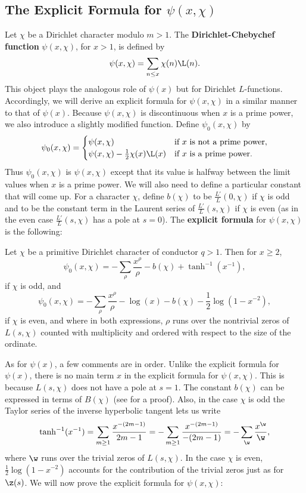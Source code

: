     \subsection*{The Explicit Formula for \texorpdfstring{$\psi(x,\chi)$}{$\psi(x,\chi)$}}
      Let $\chi$ be a Dirichlet character modulo $m > 1$. The \textbf{Dirichlet-Chebychef function} $\psi(x,\chi)$, for $x > 1$, is defined by
      \[
        \psi(x,\chi) = \sum_{n \le x}\chi(n)\L(n).
      \]
      This object plays the analogous role of $\psi(x)$ but for Dirichlet $L$-functions. Accordingly, we will derive an explicit formula for $\psi(x,\chi)$ in a similar manner to that of $\psi(x)$. Because $\psi(x,\chi)$ is discontinuous when $x$ is a prime power, we also introduce a slightly modified function. Define $\psi_{0}(x,\chi)$ by
      \[
        \psi_{0}(x,\chi) = \begin{cases} \psi(x,\chi) & \text{if $x$ is not a prime power}, \\ \psi(x,\chi)-\frac{1}{2}\chi(x)\L(x) & \text{if $x$ is a prime power}. \end{cases}
      \]
      Thus $\psi_{0}(x,\chi)$ is $\psi(x,\chi)$ except that its value is halfway between the limit values when $x$ is a prime power. We will also need to define a particular constant that will come up. For a character $\chi$, define $b(\chi)$ to be $\frac{L'}{L}(0,\chi)$ if $\chi$ is odd and to be the constant term in the Laurent series of $\frac{L'}{L}(s,\chi)$ if $\chi$ is even (as in the even case $\frac{L'}{L}(s,\chi)$ has a pole at $s = 0$). The \textbf{explicit formula} for $\psi(x,\chi)$ is the following:

      \begin{theorem}
        Let $\chi$ be a primitive Dirichlet character of conductor $q > 1$. Then for $x \ge 2$,
        \[
          \psi_{0}(x,\chi) = -\sum_{\rho}\frac{x^{\rho}}{\rho}-b(\chi)+\tanh^{-1}(x^{-1}),
        \]
        if $\chi$ is odd, and
        \[
          \psi_{0}(x,\chi) = -\sum_{\rho}\frac{x^{\rho}}{\rho}-\log(x)-b(\chi)-\frac{1}{2}\log(1-x^{-2}),
        \]
        if $\chi$ is even, and where in both expressions, $\rho$ runs over the nontrivial zeros of $L(s,\chi)$ counted with multiplicity and ordered with respect to the size of the ordinate.
      \end{theorem}

      As for $\psi(x)$, a few comments are in order. Unlike the explicit formula for $\psi(x)$, there is no main term $x$ in the explicit formula for $\psi(x,\chi)$. This is because $L(s,\chi)$ does not have a pole at $s = 1$. The constant $b(\chi)$ can be expressed in terms of $B(\chi)$ (see \cite{davenport1980multiplicative} for a proof). Also, in the case $\chi$ is odd the Taylor series of the inverse hyperbolic tangent lets us write
      \[
        \tanh^{-1}(x^{-1}) = \sum_{m \ge 1}\frac{x^{-(2m-1)}}{2m-1} = -\sum_{m \ge 1}\frac{x^{-(2m-1)}}{-(2m-1)} = -\sum_{\w}\frac{x^{\w}}{\w},
      \]
      where $\w$ runs over the trivial zeros of $L(s,\chi)$. In the case $\chi$ is even, $\frac{1}{2}\log(1-x^{-2})$ accounts for the contribution of the trivial zeros just as for $\z(s)$. We will now prove the explicit formula for $\psi(x,\chi)$:

